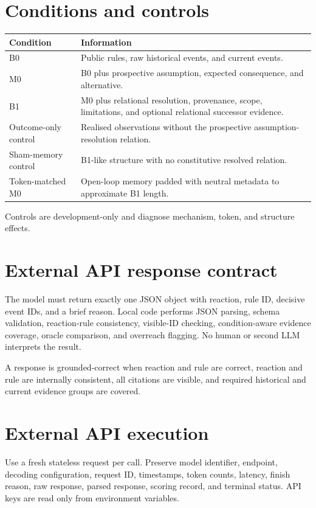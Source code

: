 \documentclass[10.5pt]{article}
\begin{document}
\section{Conditions and controls}
\begin{longtable}{p{}p{}}
\toprule\textbf{Condition}&\textbf{Information}\\\midrule
B0 & Public rules, raw historical events, and current events.\\
M0 & B0 plus prospective assumption, expected consequence, and alternative.\\
B1 & M0 plus relational resolution, provenance, scope, limitations, and optional relational successor evidence.\\
Outcome-only control & Realised observations without the prospective assumption-resolution relation.\\
Sham-memory control & B1-like structure with no constitutive resolved relation.\\
Token-matched M0 & Open-loop memory padded with neutral metadata to approximate B1 length.\\
\bottomrule
\end{longtable}
Controls are development-only and diagnose mechanism, token, and structure effects.

\section{External API response contract}
The model must return exactly one JSON object with reaction, rule ID, decisive event IDs, and a brief reason. Local code performs JSON parsing, schema validation, reaction-rule consistency, visible-ID checking, condition-aware evidence coverage, oracle comparison, and overreach flagging. No human or second LLM interprets the result.

A response is grounded-correct when reaction and rule are correct, reaction and rule are internally consistent, all citations are visible, and required historical and current evidence groups are covered.

\section{External API execution}
Use a fresh stateless request per call. Preserve model identifier, endpoint, decoding configuration, request ID, timestamps, token counts, latency, finish reason, raw response, parsed response, scoring record, and terminal status. API keys are read only from environment variables.
\end{document}
